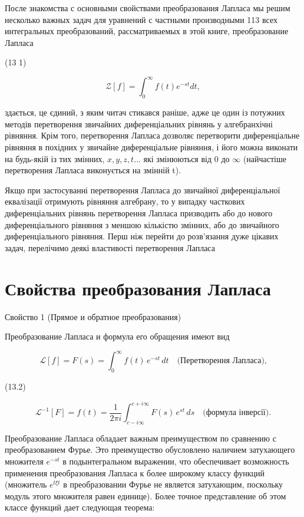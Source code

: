 \documentclass[
  ukrainian,
]{article}
\begin{document}
После знакомства с основными свойствами преобразования Лапласа мы решим
несколько важных задач для уравнений с частными производными 113 всех
интегральных преобразований, рассматриваемых в этой книге,
преобразование Лапласа

(13 1)

\[
\mathscr{Z}[f] = \int_{0}^{\infty} f(t) e^{-st} dt,
\]

здається, це єдиний, з яким читач стикався раніше, адже це один із
потужних методів перетворення звичайних диференціальних рівнянь у
алгебранхічні рівняння. Крім того, перетворення Лапласа дозволяє
перетворити диференціальне рівняння в похідних у звичайне диференціальне
рівняння, і його можна виконати на будь-якій із тих змінних,
\(x, y, z, t \ldots\) які змінюються від 0 до \(\infty\) (найчастіше
перетворення Лапласа виконується на змінній t).

Якщо при застосуванні перетворення Лапласа до звичайної диференціальної
еквалізації отримують рівняння алгебрану, то у випадку часткових
диференціальних рівнянь перетворення Лапласа призводить або до нового
диференціального рівняння з меншою кількістю змінних, або до звичайного
диференціального рівняння. Перш ніж перейти до розв'язання дуже цікавих
задач, перелічимо деякі властивості перетворення Лапласа

\section{Свойства преобразования
Лапласа}\label{ux441ux432ux43eux439ux441ux442ux432ux430-ux43fux440ux435ux43eux431ux440ux430ux437ux43eux432ux430ux43dux438ux44f-ux43bux430ux43fux43bux430ux441ux430}

Свойство 1 (Прямое и обратное преобразования)

Преобразование Лапласа и формула его обращения имеют вид

\[
\mathscr{L}[f] = F(s) = \int_{0}^{\infty} f(t) \, e^{-st} \, dt \quad \text{(Перетворення Лапласа),}
\]

(13.2)

\[
\mathscr{L}^{-1}[F] = f(t) = \frac{1}{2\pi i} \int_{c-i\infty}^{c+i\infty} F(s) \, e^{st} \, ds \quad \text{(формула інверсії).}
\]

Преобразование Лапласа обладает важным преимуществом по сравнению с
преобразованием Фурье. Это преимущество обусловлено наличием затухающего
множителя \(e^{-st}\) в подынтегральном выражении, что обеспечивает
возможность применения преобразования Лапласа к более широкому классу
функций (множитель \(e^{t\xi t}\) в преобразовании Фурье не является
затухающим, поскольку модуль этого множителя равен единице). Более
точное представление об этом классе функций дает следующая теорема:
\end{document}
